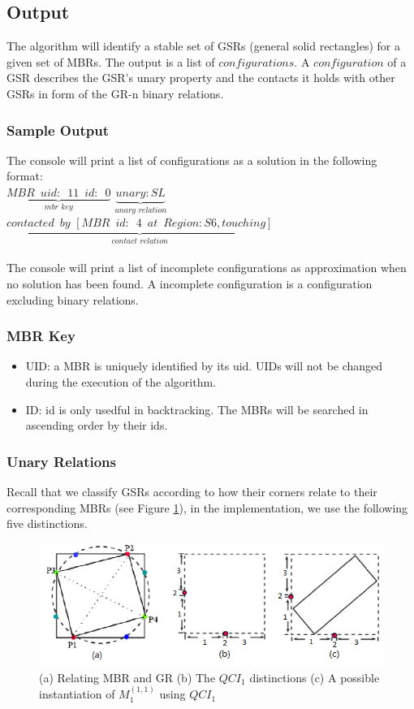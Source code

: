 \documentclass{article}
\begin{document}
\subsection{Output}
The algorithm will identify a stable set of GSRs (general solid rectangles) for a given set of MBRs. The output is a list of $configurations$. A $configuration$ of a GSR describes the GSR's unary property and the contacts it holds with other GSRs in form of the GR-n binary relations.  

\subsubsection{Sample Output}
The console will print a list of configurations as a solution in the following format:
\\$\underbrace{MBR\,\,\, uid: \,\,\,11 \,\,\,id: \,\,\,0}_{mbr \,\, key}$ $\underbrace{unary: SL}_{unary\,\, relation}$ $\underbrace{contacted\,\,\, by\,\, [ MBR\,\,\,id:\,\,\,4\,\,\,at\,\,\,Region: S6, touching ]}_{contact \,\,relation}$
\\\\The console will print a list of incomplete configurations as approximation when no solution has been found. A incomplete configuration is a configuration excluding binary relations.
\subsubsection{MBR Key}
\begin{itemize}
\item UID: a MBR is uniquely identified by its uid. UIDs will not be changed during the execution of the algorithm.
\item ID: id is only usedful in backtracking. The MBRs will be searched in ascending order by their ids. 
\end{itemize}
\subsubsection{Unary Relations} 
Recall that we classify GSRs according to how their corners relate to their corresponding MBRs (see Figure \ref{unary}), in the implementation, we use the following five distinctions.  
\begin{figure}[h!]
\centering\includegraphics[scale=0.55]{combo1}\caption{(a) Relating MBR and GR (b) The $QCI_{1}$ distinctions (c) A possible instantiation of $M_{1}^{(1,1)}$ using $QCI_{1}$ }
\label{unary} 
\end{figure}
\end{document}
